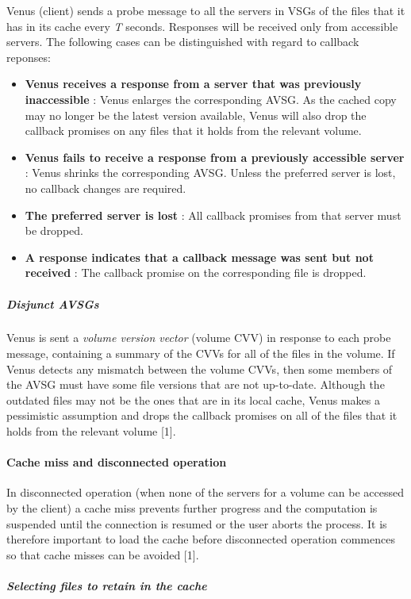Venus (client) sends a probe message to all the servers in VSGs of the files that it has in its cache every \textit{T} seconds. Responses will be received only from accessible servers. The following cases can be distinguished with regard to callback reponses:
\begin{itemize}
	\item \textbf{Venus receives a response from a server that was previously inaccessible} : Venus enlarges the corresponding AVSG. As the cached copy may no longer be the latest version available, Venus will also drop the callback promises on any files that it holds from the relevant volume.
	\item \textbf{Venus fails to receive a response from a previously accessible server} : Venus shrinks the corresponding AVSG. Unless the preferred server is lost, no callback changes are required.
	\item \textbf{The preferred server is lost} : All callback promises from that server must be dropped.
	\item \textbf{A response indicates that a callback message was sent but not received} : The callback promise on the corresponding file is dropped.
\end{itemize}


\subparagraph{Disjunct AVSGs}

Venus is sent a \emph{volume version vector} (volume CVV) in response to each probe message, containing a summary of the CVVs for all of the files in the volume. If Venus detects any mismatch between the volume CVVs, then some members of the AVSG must have some file versions that are not up-to-date. Although the outdated files may not be the ones that are in its local cache, Venus makes a pessimistic assumption and drops the callback promises on all of the files that it holds from the relevant volume [1].


\paragraph{Cache miss and disconnected operation}

In disconnected operation (when none of the servers for a volume can be accessed by the client) a cache miss prevents further progress and the computation is suspended until the connection is resumed or the user aborts the process. It is therefore important to load the cache before disconnected operation commences so that cache misses can be avoided [1].

\subparagraph{Selecting files to retain in the cache}

